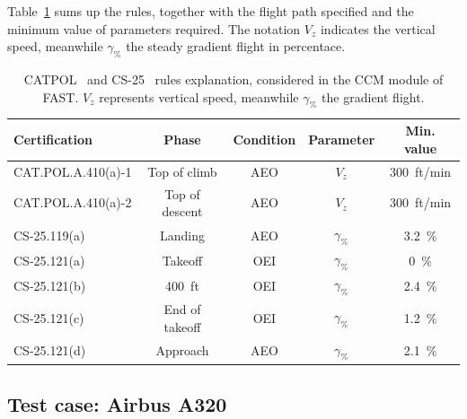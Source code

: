 Table~\ref{tab:ccm_rules} sums up the rules, together with the flight path specified and the minimum value of parameters required. The notation $V_{z}$ indicates the vertical speed, meanwhile $\gamma_{\%}$ the steady gradient flight in percentace.
\begin{table}[!h]
	\centering
	\begin{tabular}{l c c c c}
		\hline
		\textbf{Certification} & \textbf{Phase} & \textbf{Condition} & \textbf{Parameter} & \textbf{Min. value} \\
		\hline
		CAT.POL.A.410(a)-1 & Top of climb & AEO & $V_{z}$ & 300~ft/min \\
		CAT.POL.A.410(a)-2 & Top of descent & AEO & $V_{z}$ & 300~ft/min \\
		CS-25.119(a) & Landing & AEO & $\gamma_{\%}$ & 3.2~\% \\
		CS-25.121(a) & Takeoff & OEI & $\gamma_{\%}$ & 0~\% \\
		CS-25.121(b) & 400~ft & OEI & $\gamma_{\%}$ & 2.4~\% \\
		CS-25.121(c) & End of takeoff & OEI & $\gamma_{\%}$ & 1.2~\% \\
		CS-25.121(d) & Approach & AEO & $\gamma_{\%}$ & 2.1~\% \\
		\hline
	\end{tabular}
	\caption{CATPOL~\cite{bib:catpol} and CS-25~\cite{bib:cs25} rules explanation, considered in the CCM module of FAST. $V_{z}$ represents vertical speed, meanwhile $\gamma_{\%}$ the gradient flight.}
	\label{tab:ccm_rules}
\end{table}

\subsection{Test case: Airbus A320}
\label{subsec:chap2_fast_test_case}

